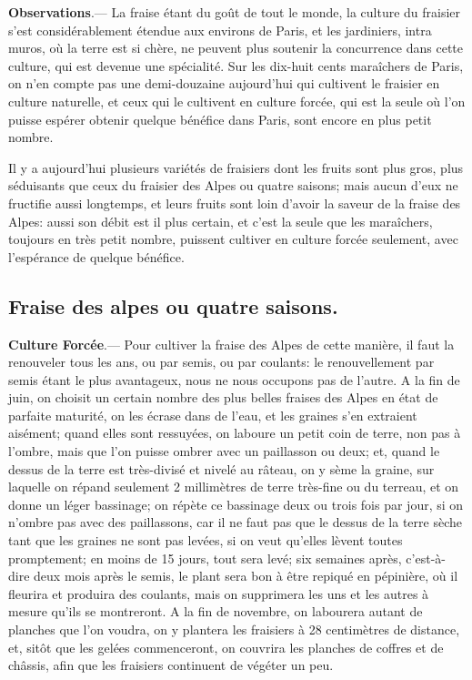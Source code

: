 \documentclass[10pt,a4paper]{book}
\begin{document}
\begin{small}
\textbf{Observations}.--- La fraise étant du goût de tout le monde, la culture du fraisier s'est considérablement étendue aux environs de Paris, et les jardiniers, intra muros, où la terre est si chère, ne peuvent plus soutenir la concurrence dans cette culture, qui est devenue une spécialité. Sur les dix-huit cents maraîchers de Paris, on n'en compte pas une demi-douzaine aujourd'hui qui cultivent le fraisier en culture naturelle, et ceux qui le cultivent en culture forcée, qui est la seule où l'on puisse espérer obtenir quelque bénéfice dans Paris, sont encore en plus petit nombre.

Il y a aujourd'hui plusieurs variétés de fraisiers dont les fruits sont plus gros, plus séduisants que ceux du fraisier des Alpes ou quatre saisons; mais aucun d'eux ne fructifie aussi longtemps, et leurs fruits sont loin d'avoir la saveur de la fraise des Alpes: aussi son débit est il plus certain, et c'est la seule que les maraîchers, toujours en très petit nombre, puissent cultiver en culture forcée seulement, avec l'espérance de quelque bénéfice.
\end{small}

\subsection{Fraise des alpes ou quatre saisons.}

\textbf{Culture Forcée}.--- Pour cultiver la fraise des Alpes de cette manière, il faut la renouveler tous les ans, ou par semis, ou par coulants: le renouvellement par semis étant le plus avantageux, nous ne nous occupons pas de l'autre. A la fin de juin, on choisit un certain nombre des plus belles fraises des Alpes en état de parfaite maturité, on les écrase dans de l'eau, et les graines s'en extraient aisément; quand elles sont ressuyées, on laboure un petit coin de terre, non pas à l'ombre, mais que l'on puisse ombrer avec un paillasson ou deux; et, quand le dessus de la terre est très-divisé et nivelé au râteau, on y sème la graine, sur laquelle on répand seulement 2 millimètres de terre très-fine ou du terreau, et on donne un léger bassinage; on répète ce bassinage deux ou trois fois par jour, si on n'ombre pas avec des paillassons, car il ne faut pas que le dessus de la terre sèche tant que les graines ne sont pas levées, si on veut qu'elles lèvent toutes promptement; en moins de 15 jours, tout sera levé; six semaines après, c'est-à-dire deux mois après le semis, le plant sera bon à être repiqué en pépinière, où il fleurira et produira des coulants, mais on supprimera les uns et les autres à mesure qu'ils se montreront. A la fin de novembre, on labourera autant de planches que l'on voudra, on y plantera les fraisiers à 28 centimètres de distance, et, sitôt que les gelées commenceront, on couvrira les planches de coffres et de châssis, afin que les fraisiers continuent de végéter un peu.
\end{document}
